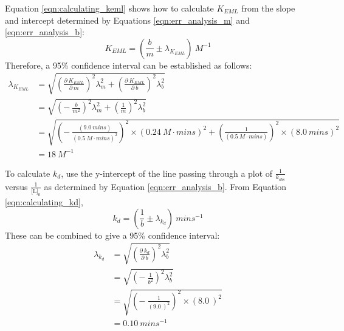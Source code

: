 Equation \eqref{eqn:calculating_keml} shows how to calculate $K_{EML}$ from the slope and intercept determined by Equations \eqref{eqn:err_analysis_m} and \eqref{eqn:err_analysis_b}:
\begin{equation*}
K_{EML}=\left (\frac{b}{m}\pm\lambda_{K_{EML}}\right ){\ }M^{-1}
\end{equation*}
Therefore, a 95\% confidence interval can be established as follows:
\begin{equation}\label{eqn:err_anal_keml}
\begin{split}
\lambda_{K_{EML}}&=\sqrt{\left (\frac{\partial{\ }K_{EML}}{\partial{\ }m}\right )^{2}\lambda_{m}^{2}+\left (\frac{\partial{\ }K_{EML}}{\partial{\ }b}\right )^{2}\lambda_{b}^{2}} \\
&=\sqrt{\left (-{\ }\frac{b}{m^{2}}\right )^{2}\lambda_{m}^{2}+\left (\frac{1}{m}\right )^{2}\lambda_{b}^{2}} \\
&=\sqrt{\left (-{\ }\frac{\left (9.0{\ }mins\right )}{\left (0.5{\ }M\cdot{mins}\right )^{2}}\right )^2\times\left (0.24{\ }M\cdot{mins}\right )^2+\left (\frac{1}{\left (0.5{\ }M\cdot{mins}\right )}\right )^2\times\left (8.0{\ }mins\right )^2} \\
&=18\ M^{-1}
\end{split}
\end{equation}

To calculate $k_d$, use the y-intercept of the line passing through a plot of $\frac{1}{k_{obs}}$ versus $\frac{1}{\text{[L]}_0}$ as determined by Equation \eqref{eqn:err_analysis_b}. From Equation \eqref{eqn:calculating_kd},
\begin{equation*}
k_{d}=\left (\frac{1}{b}\pm\lambda_{k_{d}}\right ){\ }mins^{-1}
\end{equation*}
These can be combined to give a 95\% confidence interval:
\begin{equation}\label{eqn:err_anal_kd}
\begin{split}
\lambda_{k_{d}}&=\sqrt{\left (\frac{\partial{\ }k_{d}}{\partial{\ }b}\right )^{2}\lambda_{b}^{2}}\\
&=\sqrt{\left (-{\ }\frac{1}{b^{2}}\right )^{2}\lambda_{b}^{2}}\\
&=\sqrt{\left (-{\ }\frac{1}{\left (9.0{\ }\right )^{2}}\right )^2\times\left (8.0{\ }\right )^2}\\
&=0.10\ mins^{-1}
\end{split}
\end{equation}
